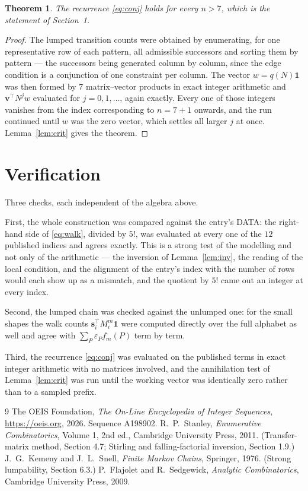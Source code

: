 \documentclass[11pt,a4paper]{article}
\theoremstyle{plain}
\newtheorem{theorem}{Theorem}
\theoremstyle{definition}
\begin{document}
\begin{theorem}
The recurrence \eqref{eq:conj} holds for every $n>7$, which is the statement of
Section~1.
\end{theorem}

\begin{proof}
The lumped transition counts were obtained by enumerating, for one representative row of
each pattern, all admissible successors and sorting them by pattern --- the successors being
generated column by column, since the edge condition is a conjunction of one constraint per
column. The vector $w=q(N)\mathbf{1}$ was then formed by $7$ matrix--vector products
in exact integer arithmetic and $\mathbf{v}^{\!\top}N^{j}w$ evaluated for
$j=0,1,\dots$, again exactly. Every one of those integers vanishes from the index
corresponding to $n=7+1$ onwards, and the run continued until $w$ was the zero vector,
which settles all larger $j$ at once. Lemma~\ref{lem:crit} gives the theorem.
\end{proof}

\section{Verification}

Three checks, each independent of the algebra above.

First, the whole construction was compared against the entry's DATA: the right-hand side of
\eqref{eq:walk}, divided by $5!$, was evaluated at every one of the $12$
published indices and agrees exactly. This is a strong test of the modelling and not only of
the arithmetic --- the inversion of Lemma~\ref{lem:inv}, the reading of the local
condition, and the alignment of the entry's index with the number of rows would each
show up as a mismatch, and the quotient by $5!$ came out an integer at every index.

Second, the lumped chain was checked against the unlumped one: for the small shapes the walk
counts $\mathbf{s}_i^{\!\top}M_i^{m}\mathbf{1}$ were computed directly over the full
alphabet as well and agree with $\sum_P\varepsilon_Pf_m(P)$ term by term.

Third, the recurrence \eqref{eq:conj} was evaluated on the published terms in exact integer
arithmetic with no matrices involved, and the annihilation test of Lemma~\ref{lem:crit} was
run until the working vector was identically zero rather than to a sampled prefix.

\begin{thebibliography}{9}
 The OEIS Foundation, \emph{The On-Line Encyclopedia of Integer
Sequences}, \url{https://oeis.org}, 2026. Sequence A198902.
 R.~P.~Stanley, \emph{Enumerative Combinatorics}, Volume 1, 2nd ed.,
Cambridge University Press, 2011. (Transfer-matrix method, Section 4.7; Stirling and
falling-factorial inversion, Section 1.9.)
 J.~G.~Kemeny and J.~L.~Snell, \emph{Finite Markov Chains}, Springer,
1976. (Strong lumpability, Section 6.3.)
 P.~Flajolet and R.~Sedgewick, \emph{Analytic Combinatorics}, Cambridge
University Press, 2009.
\end{thebibliography}
\end{document}

